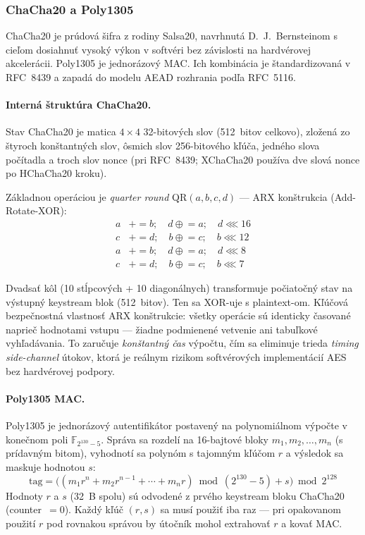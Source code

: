 \documentclass[journal,a4paper,onecolumn]{IEEEtran}
\let\lllRel\lll
\renewcommand{\lll}{\mathbin{\lllRel}}
\begin{document}
\subsubsection{ChaCha20 a Poly1305}

ChaCha20 je prúdová šifra z rodiny Salsa20, navrhnutá D.~J.~Bernsteinom s cieľom dosiahnuť vysoký výkon v softvéri bez závislosti na hardvérovej akcelerácii\cite{Bernstein2012}. Poly1305 je jednorázový MAC. Ich kombinácia je štandardizovaná v RFC~8439 a zapadá do modelu AEAD rozhrania podľa RFC~5116\cite{RFC8439,RFC5116}.

\paragraph{Interná štruktúra ChaCha20.}
Stav ChaCha20 je matica $4\times4$ 32-bitových slov (512~bitov celkovo), zložená zo štyroch konštantných slov, ôsmich slov 256-bitového kľúča, jedného slova počítadla a troch slov nonce (pri RFC~8439; XChaCha20 používa dve slová nonce po HChaCha20 kroku).

Základnou operáciou je \emph{quarter round} QR$(a, b, c, d)$ --- ARX konštrukcia (Add-Rotate-XOR):
\begin{align}
a &\mathrel{+}= b;\quad d \mathrel{\oplus}= a;\quad d \lll 16 \nonumber \\
c &\mathrel{+}= d;\quad b \mathrel{\oplus}= c;\quad b \lll 12 \nonumber \\
a &\mathrel{+}= b;\quad d \mathrel{\oplus}= a;\quad d \lll 8  \nonumber \\
c &\mathrel{+}= d;\quad b \mathrel{\oplus}= c;\quad b \lll 7  \nonumber
\end{align}

Dvadsať kôl (10 stĺpcových + 10 diagonálnych) transformuje počiatočný stav na výstupný keystream blok (512~bitov). Ten sa XOR-uje s plaintext-om\cite{RFC8439}. Kľúčová bezpečnostná vlastnosť ARX konštrukcie: všetky operácie sú identicky časované naprieč hodnotami vstupu --- žiadne podmienené vetvenie ani tabuľkové vyhľadávania. To zaručuje \emph{konštantný čas} výpočtu, čím sa eliminuje trieda \emph{timing side-channel} útokov, ktorá je reálnym rizikom softvérových implementácií AES bez hardvérovej podpory\cite{Bernstein2012}.

\paragraph{Poly1305 MAC.}
Poly1305 je jednorázový autentifikátor postavený na polynomiálnom výpočte v konečnom poli $\mathbb{F}_{2^{130}-5}$. Správa sa rozdelí na 16-bajtové bloky $m_1, m_2, \ldots, m_n$ (s prídavným bitom), vyhodnotí sa polynóm s tajomným kľúčom $r$ a výsledok sa maskuje hodnotou $s$:
\begin{equation}
\text{tag} = \bigl((m_1 r^n + m_2 r^{n-1} + \cdots + m_n r) \bmod (2^{130}-5) + s\bigr) \bmod 2^{128}
\end{equation}
Hodnoty $r$ a $s$ (32~B spolu) sú odvodené z prvého keystream bloku ChaCha20 (counter~$= 0$). Každý kľúč $(r, s)$ sa musí použiť iba raz --- pri opakovanom použití $r$ pod rovnakou správou by útočník mohol extrahovať $r$ a kovať MAC\cite{RFC8439}.
\end{document}
